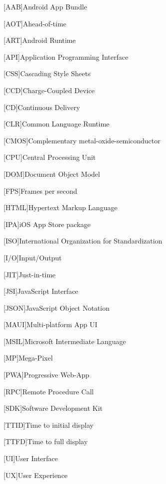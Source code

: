 \begin{acronym}[AAAAA]

[AAB]{Android App Bundle}

[AOT]{Ahead-of-time}

[ART]{Android Runtime}

[API]{Application Programming Interface}

[CSS]{Cascading Style Sheets}

[CCD]{Charge-Coupled Device}

[CD]{Continuous Delivery}

[CLR]{Common Language Runtime}

[CMOS]{Complementary metal-oxide-semiconductor}

[CPU]{Central Processing Unit}

[DOM]{Document Object Model}

[FPS]{Frames per second}

[HTML]{Hypertext Markup Language}

[IPA]{iOS App Store package}

[ISO]{International Organization for Standardization}

[I/O]{Input/Output}

[JIT]{Just-in-time}

[JSI]{JavaScript Interface}

[JSON]{JavaScript Object Notation}

[MAUI]{Multi-platform App UI}

[MSIL]{Microsoft Intermediate Language}

[MP]{Mega-Pixel}

[PWA]{Progressive Web-App}

[RPC]{Remote Procedure Call}

[SDK]{Software Development Kit}

[TTID]{Time to initial display}

[TTFD]{Time to full display}

[UI]{User Interface}

[UX]{User Experience}

\end{acronym}